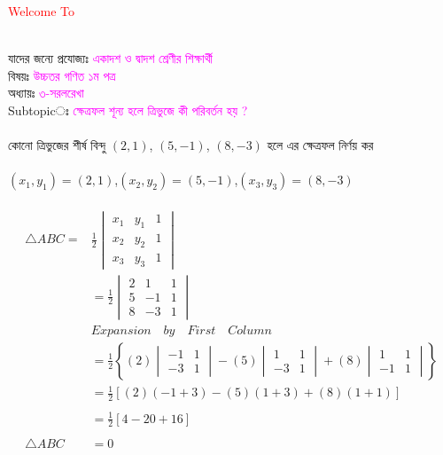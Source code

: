 \documentclass{article}
\begin{document}
 
	\Large
	\textcolor{red}{Welcome To} 
	\\
	\\
	যাদের জন্যে প্রযোজ্যঃ  	\textcolor{magenta}{একাদশ ও দ্বাদশ শ্রেণীর শিক্ষার্থী} \\
	বিষয়ঃ \textcolor{magenta}{উচ্চতর গণিত ১ম পত্র} \\
	অধ্যায়ঃ \textcolor{magenta}{৩-সরলরেখা}\\ 
	Subtopicঃ  \textcolor{magenta}{ ক্ষেত্রফল শূন্য হলে ত্রিভুজে কী পরিবর্তন হয় ?  }\\
	\\
	 কোনো ত্রিভুজের শীর্ষ বিন্দু $(2,1)$, $(5,-1)$, $(8,-3)$ হলে এর ক্ষেত্রফল নির্ণয় কর \\
	 \\ 
	 $(x_1,y_1)=(2,1)$,\quad $(x_2,y_2)=(5,-1)$,\quad $(x_3,y_3)=(8,-3)$\\
	 \\ 
	 \begin{align*}
	 	\triangle ABC=	&\frac{1}{2}\begin{vmatrix}
	 		x_1 &	y_1 & 1\\
	 		x_2 & y_2 & 1\\
	 		x_3 & y_3 & 1
	 	\end{vmatrix}\\
	 	&=\frac{1}{2}\begin{vmatrix}
	 		2 & 1 & 1\\
	 		5 & -1 & 1\\
	 		8 & -3 & 1
	 	\end{vmatrix}\\
	 	&\boxed{Expansion \quad by \quad  First \quad  Column}\\ 
	 	&=\frac{1}{2}\left\{(2)\begin{vmatrix}
	 		-1 & 1\\
	 		-3 & 1
	 	\end{vmatrix}-(5)\begin{vmatrix}
	 		1 & 1\\
	 		-3 & 1
	 	\end{vmatrix}+(8)\begin{vmatrix}
	 		1 & 1\\
	 		-1 & 1
	 	\end{vmatrix}\right\}\\
	 	&=\frac{1}{2}\left[(2)(-1+3)-(5)(1+3)+(8)(1+1)\right]\\
	 	\\
	 	&=\frac{1}{2}\left[4-20+16\right]\\
	 	\\
	 	\triangle ABC	&=0
	 \end{align*}
\end{document}
